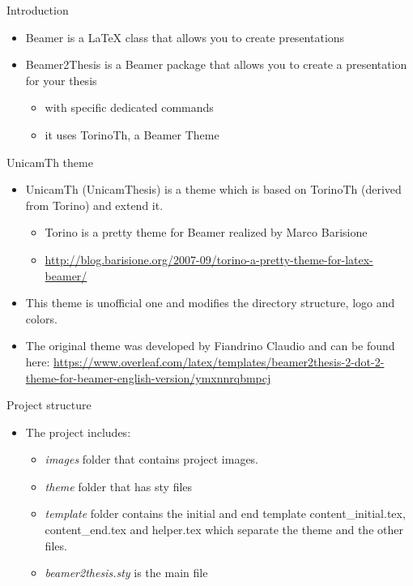 \begin{tframe}{Introduction}
\cite{lehmann2005testing}

\begin{itemize}
\item Beamer is a \LaTeX{} class that allows you to create presentations
\item Beamer2Thesis is a Beamer package that allows you to create a presentation for your thesis
\begin{itemize}
\item with specific dedicated commands
\item it uses TorinoTh, a Beamer Theme
\end{itemize}
\end{itemize}
\end{tframe}

\begin{tframe}{UnicamTh theme}
\begin{itemize}
\item UnicamTh (UnicamThesis) is a theme which is based on TorinoTh (derived from Torino) and extend it.  
\begin{itemize}
\item Torino is a pretty theme for Beamer realized by Marco Barisione
\item \href{http://blog.barisione.org/2007-09/torino-a-pretty-theme-for-latex-beamer/}{http://blog.barisione.org/2007-09/torino-a-pretty-theme-for-latex-beamer/}
\end{itemize}
\item This theme is unofficial one and modifies the directory structure, logo and colors.
\item The original theme was developed by Fiandrino Claudio and can be found here: \href{https://www.overleaf.com/latex/templates/beamer2thesis-2-dot-2-theme-for-beamer-english-version/ymxnnrqbmpcj}{https://www.overleaf.com/latex/templates/beamer2thesis-2-dot-2-theme-for-beamer-english-version/ymxnnrqbmpcj}

\end{itemize}
\end{tframe}

\begin{tframe}{Project structure}
\begin{itemize}
\item The project includes:
\begin{itemize}
\item \emph{images} folder that contains project images.
\item \emph{theme} folder that has sty files
\item \emph{template} folder contains the initial and end template content\_initial.tex, content\_end.tex and helper.tex which separate the theme and the other files.
\item \emph{beamer2thesis.sty} is the main file
\end{itemize}
\end{itemize}
\end{tframe}

